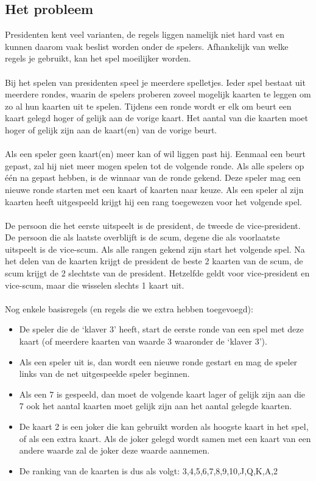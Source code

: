 \documentclass[11pt]{article}
\begin{document}
\subsection{Het probleem}
Presidenten kent veel varianten, de regels liggen namelijk niet hard vast en kunnen daarom vaak beslist worden onder de spelers. Afhankelijk van welke regels je gebruikt, kan het spel moeilijker worden. \\\\
Bij het spelen van presidenten speel je meerdere spelletjes. Ieder spel bestaat uit meerdere rondes, waarin de spelers proberen zoveel mogelijk kaarten te leggen om zo al hun kaarten uit te spelen. Tijdens een ronde wordt er elk om beurt een kaart gelegd hoger of gelijk aan de vorige kaart. Het aantal van die kaarten moet hoger of gelijk zijn aan de kaart(en) van de vorige beurt.\\\\
Als een speler geen kaart(en) meer kan of wil liggen past hij. Eenmaal een beurt gepast, zal hij niet meer mogen spelen tot de volgende ronde. Als alle spelers op één na gepast hebben, is de winnaar van de ronde gekend. Deze speler mag een nieuwe ronde starten met een kaart of kaarten naar keuze. Als een speler al zijn kaarten heeft uitgespeeld krijgt hij een rang toegewezen voor het volgende spel.\\\\
De persoon die het eerste uitspeelt is de president, de tweede de vice-president.
De persoon die als laatste overblijft is de scum, degene die als voorlaatste uitspeelt is de vice-scum. Als alle rangen gekend zijn start het volgende spel. Na het delen van de kaarten krijgt de president de beste 2 kaarten van de scum, de scum krijgt de 2 slechtste van de president. Hetzelfde geldt voor vice-president en vice-scum, maar die wisselen slechts 1 kaart uit.\\\\
Nog enkele basisregels (en regels die we extra hebben toegevoegd):
\begin{itemize}
\item De speler die de ‘klaver 3’ heeft, start de eerste ronde van een spel met deze kaart (of meerdere kaarten van waarde 3 waaronder de `klaver 3'). 
\item Als een speler uit is, dan wordt een nieuwe ronde gestart en mag de speler links van de net uitgespeelde speler beginnen.
\item Als een 7 is gespeeld, dan moet de volgende kaart lager of gelijk zijn aan die 7 ook het aantal kaarten moet gelijk zijn aan het aantal gelegde kaarten.
\item De kaart 2 is een joker die kan gebruikt worden als hoogste kaart in het spel, of als een extra kaart. Als de joker gelegd wordt samen met een kaart van een andere waarde zal de joker deze waarde aannemen.
\item De ranking van de kaarten is dus als volgt: 3,4,5,6,7,8,9,10,J,Q,K,A,2
\end{itemize}
\end{document}
